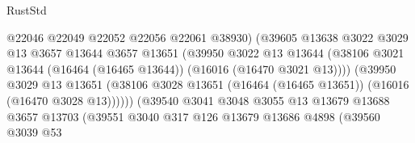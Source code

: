 \begin{lexlean}{RustStd}
\begin{coremodule}
                                          @22046
                                          @22049
                                          @22052
                                          @22056
                                          @22061
                                          @38930)
                                        (@39605
                                          @13638
                                          @3022
                                          @3029
                                          @13
                                          @3657
                                          @13644
                                          @3657
                                          @13651
                                          (@39950
                                            @3022
                                            @13
                                            @13644
                                            (@38106
                                              @3021
                                              @13644
                                              (@16464 (@16465 @13644))
                                              (@16016 (@16470 @3021 @13))))
                                          (@39950
                                            @3029
                                            @13
                                            @13651
                                            (@38106
                                              @3028
                                              @13651
                                              (@16464 (@16465 @13651))
                                              (@16016 (@16470 @3028 @13))))))
                                      (@39540
                                        @3041
                                        @3048
                                        @3055
                                        @13
                                        @13679
                                        @13688
                                        @3657
                                        @13703
                                        (@39551
                                          @3040
                                          @317
                                          @126
                                          @13679
                                          @13686
                                          @4898
                                          (@39560
                                            @3039
                                            @53

\end{coremodule}
\end{lexlean}
